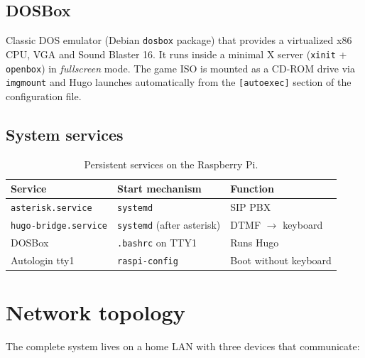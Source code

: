 \subsection{DOSBox}

Classic DOS emulator (Debian \texttt{dosbox} package) that provides a virtualized x86 CPU, VGA and Sound Blaster 16. It runs inside a minimal X server (\texttt{xinit} + \texttt{openbox}) in \emph{fullscreen} mode. The game ISO is mounted as a CD-ROM drive via \texttt{imgmount} and Hugo launches automatically from the \texttt{[autoexec]} section of the configuration file.

\subsection{System services}

\begin{table}[h]
\centering
\begin{tabular}{lll}
\toprule
\textbf{Service} & \textbf{Start mechanism} & \textbf{Function} \\
\midrule
\texttt{asterisk.service} & \texttt{systemd} & SIP PBX \\
\texttt{hugo-bridge.service} & \texttt{systemd} (after asterisk) & DTMF $\to$ keyboard \\
DOSBox & \texttt{.bashrc} on TTY1 & Runs Hugo \\
Autologin tty1 & \texttt{raspi-config} & Boot without keyboard \\
\bottomrule
\end{tabular}
\caption{Persistent services on the Raspberry Pi.}
\end{table}

\section{Network topology}

The complete system lives on a home LAN with three devices that communicate:

\begin{center}
\end{center}

